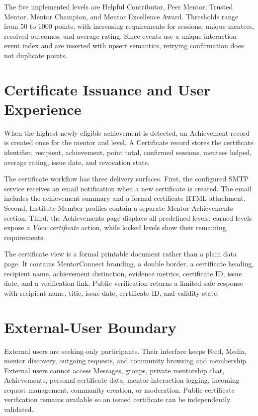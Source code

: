 \documentclass[conference]{IEEEtran}
\begin{document}
The five implemented levels are Helpful Contributor, Peer Mentor, Trusted Mentor, Mentor Champion, and Mentor Excellence Award. Thresholds range from 50 to 1000 points, with increasing requirements for sessions, unique mentees, resolved outcomes, and average rating. Since events use a unique interaction-event index and are inserted with upsert semantics, retrying confirmation does not duplicate points.

\section{Certificate Issuance and User Experience}
When the highest newly eligible achievement is detected, an Achievement record is created once for the mentor and level. A Certificate record stores the certificate identifier, recipient, achievement, point total, confirmed sessions, mentees helped, average rating, issue date, and revocation state.

The certificate workflow has three delivery surfaces. First, the configured SMTP service receives an email notification when a new certificate is created. The email includes the achievement summary and a formal certificate HTML attachment. Second, Institute Member profiles contain a separate Mentor Achievements section. Third, the Achievements page displays all predefined levels: earned levels expose a \textit{View certificate} action, while locked levels show their remaining requirements.

The certificate view is a formal printable document rather than a plain data page. It contains MentorConnect branding, a double border, a certificate heading, recipient name, achievement distinction, evidence metrics, certificate ID, issue date, and a verification link. Public verification returns a limited safe response with recipient name, title, issue date, certificate ID, and validity state.

\section{External-User Boundary}
External users are seeking-only participants. Their interface keeps Feed, Media, mentor discovery, outgoing requests, and community browsing and membership. External users cannot access Messages, groups, private mentorship chat, Achievements, personal certificate data, mentor interaction logging, incoming request management, community creation, or moderation. Public certificate verification remains available so an issued certificate can be independently validated.
\end{document}
